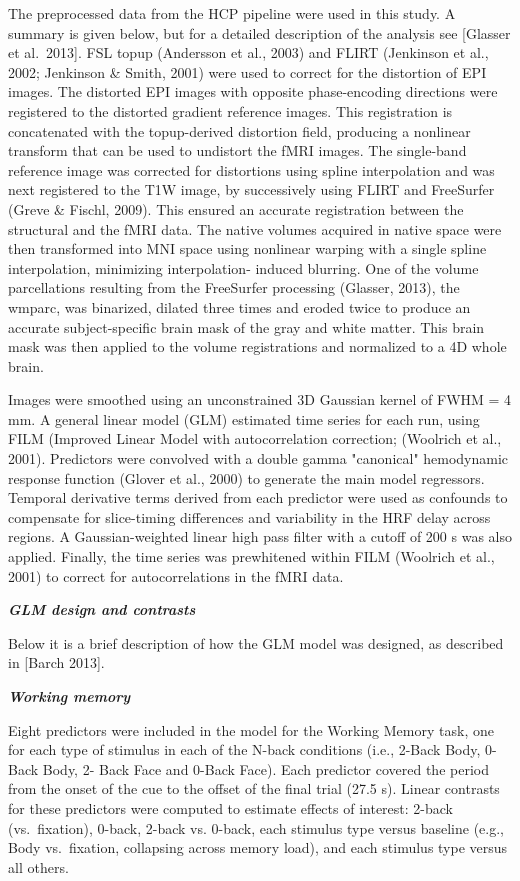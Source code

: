 \documentclass[11pt]{article}
\begin{document}
The preprocessed data from the HCP pipeline were used in this study. A
summary is given below, but for a detailed description of the analysis
see {[}Glasser et al.~2013{]}. FSL topup (Andersson et al., 2003) and
FLIRT (Jenkinson et al., 2002; Jenkinson \& Smith, 2001) were used to
correct for the distortion of EPI images. The distorted EPI images with
opposite phase-encoding directions were registered to the distorted
gradient reference images. This registration is concatenated with the
topup-derived distortion field, producing a nonlinear transform that can
be used to undistort the fMRI images. The single-band reference image
was corrected for distortions using spline interpolation and was next
registered to the T1W image, by successively using FLIRT and FreeSurfer
(Greve \& Fischl, 2009). This ensured an accurate registration between
the structural and the fMRI data. The native volumes acquired in native
space were then transformed into MNI space using nonlinear warping with
a single spline interpolation, minimizing interpolation- induced
blurring. One of the volume parcellations resulting from the FreeSurfer
processing (Glasser, 2013), the wmparc, was binarized, dilated three
times and eroded twice to produce an accurate subject-specific brain
mask of the gray and white matter. This brain mask was then applied to
the volume registrations and normalized to a 4D whole brain.

Images were smoothed using an unconstrained 3D Gaussian kernel of FWHM =
4 mm. A general linear model (GLM) estimated time series for each run,
using FILM (Improved Linear Model with autocorrelation correction;
(Woolrich et al., 2001). Predictors were convolved with a double gamma
"canonical" hemodynamic response function (Glover et al., 2000) to
generate the main model regressors. Temporal derivative terms derived
from each predictor were used as confounds to compensate for
slice-timing differences and variability in the HRF delay across
regions. A Gaussian-weighted linear high pass filter with a cutoff of
200 s was also applied. Finally, the time series was prewhitened within
FILM (Woolrich et al., 2001) to correct for autocorrelations in the fMRI
data.

\textbf{\emph{GLM design and contrasts}}

Below it is a brief description of how the GLM model was designed, as
described in {[}Barch 2013{]}.

\textbf{\emph{Working memory}}

Eight predictors were included in the model for the Working Memory task,
one for each type of stimulus in each of the N-back conditions (i.e.,
2-Back Body, 0-Back Body, 2- Back Face and 0-Back Face). Each predictor
covered the period from the onset of the cue to the offset of the final
trial (27.5 s). Linear contrasts for these predictors were computed to
estimate effects of interest: 2-back (vs.~fixation), 0-back, 2-back vs.
0-back, each stimulus type versus baseline (e.g., Body vs.~fixation,
collapsing across memory load), and each stimulus type versus all
others.
\end{document}
